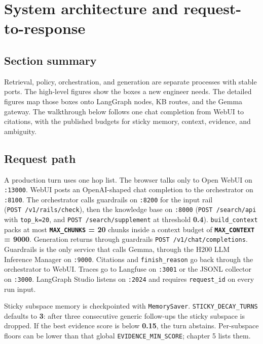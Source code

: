 \chapter{System architecture and request-to-response}\label{system-architecture-and-request-to-response}

\section{Section summary}\label{section-summary}

Retrieval, policy, orchestration, and generation are separate processes with stable ports. The high-level figures show the boxes a new engineer needs. The detailed figures map those boxes onto LangGraph nodes, KB routes, and the Gemma gateway. The walkthrough below follows one chat completion from WebUI to citations, with the published budgets for sticky memory, context, evidence, and ambiguity.

\section{Request path}\label{request-path}

A production turn uses one hop list. The browser talks only to Open WebUI on \texttt{:13000}. WebUI posts an OpenAI-shaped chat completion to the orchestrator on \texttt{:8100}. The orchestrator calls guardrails on \texttt{:8200} for the input rail (\texttt{POST\ /v1/rails/check}), then the knowledge base on \texttt{:8000} (\texttt{POST\ /search/api} with \texttt{top\_k=20}, and \texttt{POST\ /search/supplement} at threshold \textbf{0.4}). \texttt{build\_context} packs at most \textbf{\texttt{MAX\_CHUNKS} = 20} chunks inside a context budget of \textbf{\texttt{MAX\_CONTEXT} = 9000}. Generation returns through guardrails \texttt{POST\ /v1/chat/completions}. Guardrails is the only service that calls Gemma, through the H200 LLM Inference Manager on \texttt{:9000}. Citations and \texttt{finish\_reason} go back through the orchestrator to WebUI. Traces go to Langfuse on \texttt{:3001} or the JSONL collector on \texttt{:3000}. LangGraph Studio listens on \texttt{:2024} and requires \texttt{request\_id} on every run input.

Sticky subspace memory is checkpointed with \texttt{MemorySaver}. \texttt{STICKY\_DECAY\_TURNS} defaults to \textbf{3}: after three consecutive generic follow-ups the sticky subspace is dropped. If the best evidence score is below \textbf{0.15}, the turn abstains. Per-subspace floors can be lower than that global \texttt{EVIDENCE\_MIN\_SCORE}; chapter 5 lists them.


